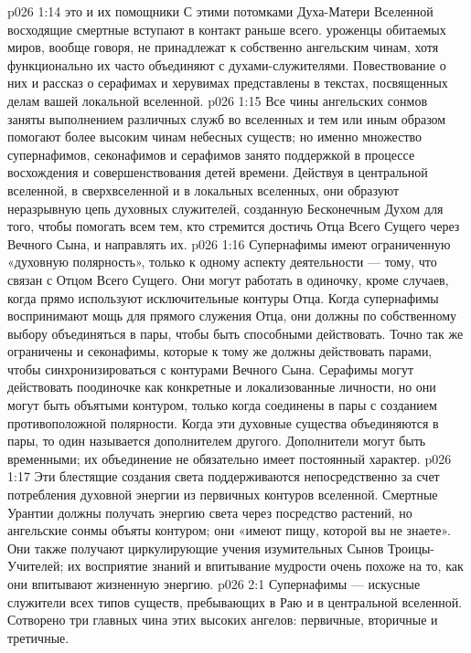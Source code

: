 \vs p026 1:14 \pc {}\bibnobreakspace {} это  и их помощники  С этими потомками Духа\hyp{}Матери Вселенной восходящие смертные вступают в контакт раньше всего.  уроженцы обитаемых миров, вообще говоря, не принадлежат к собственно ангельским чинам, хотя функционально их часто объединяют с духами\hyp{}служителями. Повествование о них и рассказ о серафимах и херувимах представлены в текстах, посвященных делам вашей локальной вселенной.
\vs p026 1:15 \pc Все чины ангельских сонмов заняты выполнением различных служб во вселенных и тем или иным образом помогают более высоким чинам небесных существ; но именно множество супернафимов, секонафимов и серафимов занято поддержкой в процессе восхождения и совершенствования детей времени. Действуя в центральной вселенной, в сверхвселенной и в локальных вселенных, они образуют неразрывную цепь духовных служителей, созданную Бесконечным Духом для того, чтобы помогать всем тем, кто стремится достичь Отца Всего Сущего через Вечного Сына, и направлять их.
\vs p026 1:16 Супернафимы имеют ограниченную «духовную полярность», только к одному аспекту деятельности --- тому, что связан с Отцом Всего Сущего. Они могут работать в одиночку, кроме случаев, когда прямо используют исключительные контуры Отца. Когда супернафимы воспринимают мощь для прямого служения Отца, они должны по собственному выбору объединяться в пары, чтобы быть способными действовать. Точно так же ограничены и секонафимы, которые к тому же должны действовать парами, чтобы синхронизироваться с контурами Вечного Сына. Серафимы могут действовать поодиночке как конкретные и локализованные личности, но они могут быть объятыми контуром, только когда соединены в пары с созданием противоположной полярности. Когда эти духовные существа объединяются в пары, то один называется дополнителем другого. Дополнители могут быть временными; их объединение не обязательно имеет постоянный характер.
\vs p026 1:17 Эти блестящие создания света поддерживаются непосредственно за счет потребления духовной энергии из первичных контуров вселенной. Смертные Урантии должны получать энергию света через посредство растений, но ангельские сонмы объяты контуром; они «имеют пищу, которой вы не знаете». Они также получают циркулирующие учения изумительных Сынов Троицы\hyp{}Учителей; их восприятие знаний и впитывание мудрости очень похоже на то, как они впитывают жизненную энергию.
\vs p026 2:1 Супернафимы --- искусные служители всех типов существ, пребывающих в Раю и в центральной вселенной. Сотворено три главных чина этих высоких ангелов: первичные, вторичные и третичные.
